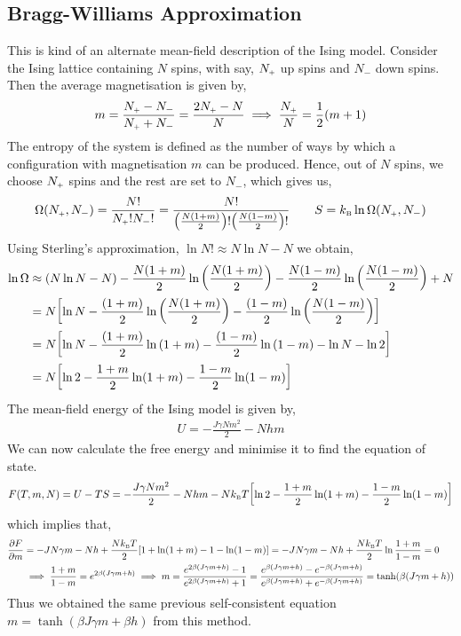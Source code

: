 \subsection{Bragg-Williams Approximation}
This is kind of an alternate mean-field description of the Ising model. Consider the Ising lattice containing $N$ spins, with say, $N_{\text{\tiny +}}$ up spins and $N_-$ down spins. Then the average magnetisation is given by,
\begin{align*}
    m = \frac{N_{\text{\tiny +}} - N_-}{N_{\text{\tiny +}}+N_-} = \frac{2N_{\text{\tiny +}}-N}{N} \implies \frac{N_{\text{\tiny +}}}{N} = \frac{1}{2}(m+1)
\end{align*}
The entropy of the system is defined as the number of ways by which a configuration with magnetisation $m$ can be produced. Hence, out of $N$ spins, we choose $N_{\text{\tiny +}}$ spins and the rest are set to $N_-$, which gives us,
\begin{align*}
   \Omega(N_{\text{\tiny +}}, N_-) = \frac{N!}{N_{\text{\tiny +}}! N_-!}  =\frac{N!}{\qty(\frac{N(1+m)}{2})!\qty(\frac{N(1-m)}{2})! } \qquad S = k_{\text{\tiny B}} \ln \Omega(N_{\text{\tiny +}}, N_-) 
\end{align*} 
Using Sterling's approximation, $\ln N! \approx N\ln N - N$ we obtain,
\begin{align*}
    \ln \Omega &\approx (N \ln N - N) - \frac{N(1+m)}{2}\ln \qty(\frac{N(1+m)}{2}) -\frac{N(1-m)}{2}\ln \qty(\frac{N(1-m)}{2})+N\\
    &=N\qty[\ln N  - \frac{(1+m)}{2}\ln \qty(\frac{N(1+m)}{2}) -\frac{(1-m)}{2}\ln \qty(\frac{N(1-m)}{2})]\\
    &=N\qty[\ln N  - \frac{(1+m)}{2}\ln \qty(1+m) -\frac{(1-m)}{2}\ln \qty(1-m) - \ln N - \ln 2]\\
    &=N\qty[\ln 2 - \frac{1+m}{2}\ln (1+m) - \frac{1-m}{2}\ln (1-m)]
\end{align*}
The mean-field energy of the Ising model is given by, 
\begin{align*}
    U = -\frac{J\gamma Nm^2}{2}-Nhm
\end{align*}
We can now calculate the free energy and minimise it to find the equation of state. 
\begin{align*}
    F(T,m,N) = U -TS = -\frac{J\gamma Nm^2}{2}-Nhm - Nk_{\text{\tiny B}} T\qty[\ln 2 - \frac{1+m}{2}\ln (1+m) - \frac{1-m}{2}\ln (1-m)]
\end{align*}
which implies that,
\begin{align*}
    \pdv{F}{m} &= -JN\gamma m - Nh + \frac{Nk_{\text{\tiny B}} T}{2}\qty[1 + \ln(1+m) -1 -\ln(1-m)] =-JN\gamma m - Nh + \frac{Nk_{\text{\tiny B}} T}{2}\ln\frac{1+m}{1-m}=0\\
    &\implies  \frac{1+m}{1-m} = e^{2\beta(J\gamma m + h)} \implies m = \frac{e^{2\beta(J\gamma m + h)}-1}{e^{2\beta(J\gamma m + h)}+1} = \frac{e^{\beta(J\gamma m + h)} -e^{-\beta(J\gamma m + h)}}{e^{\beta(J\gamma m + h)} +e^{-\beta(J\gamma m + h)}} = \tanh(\beta(J\gamma m + h))
\end{align*}
Thus we obtained the same previous self-consistent equation $m = \tanh(\beta J\gamma m + \beta h)$ from this method. 
